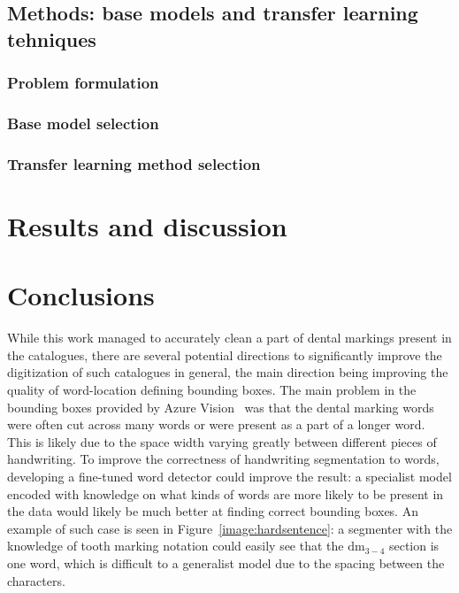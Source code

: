 \documentclass{article}
\begin{document}
\subsection{Methods: base models and transfer learning tehniques}

\subsubsection{Problem formulation}

\subsubsection{Base model selection}

\subsubsection{Transfer learning method selection}

\section{Results and discussion}

\section{Conclusions}

While this work managed to accurately clean a part of dental markings present in the catalogues, 
there are several potential directions to significantly improve the digitization of such catalogues in general, the main direction 
being improving the quality of word-location defining bounding boxes. The main problem in the bounding boxes provided 
by Azure Vision~\cite{azurevision} was that the dental marking words were often cut across many words or were present 
as a part of a longer word. This is likely due to the space width varying greatly between different pieces of 
handwriting. To improve the correctness of handwriting segmentation to words, developing a fine-tuned word detector 
could improve the result: a specialist model encoded with knowledge on what kinds of words are more likely to be 
present in the data would likely be much better at finding correct bounding boxes. An example of 
such case is seen in Figure~\ref{image:hardsentence}: a segmenter with the knowledge of tooth marking notation could 
easily see that the $\text{dm}_{3-4}$ section is one word, which is difficult to a generalist model 
due to the spacing between the characters.
\end{document}
